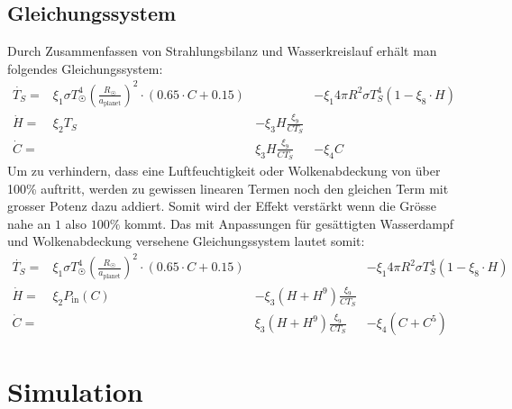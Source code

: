 \begin{refsection}
\subsection{Gleichungssystem}

Durch Zusammenfassen von Strahlungsbilanz und Wasserkreislauf erhält man folgendes Gleichungssystem:
\begin{equation}
\begin{matrix}
\dot{T_S} = & \xi_1 \sigma T_{\astrosun}^4 \left( \frac{R_{\astrosun}}{a_{\text{planet}}} \right) ^2 \cdot (0.65 \cdot C + 0.15) && - \xi_1 4 \pi R^2 \sigma T_{S}^4  (1 - \xi_8 \cdot H)\\
\dot{H}   = & \xi_2 T_S              & - \xi_3 H \frac{\xi_9}{C T_S}          & \\
\dot{C}   = &                        &   \xi_3 H \frac{\xi_9}{C T_S}          & - \xi_4 C
\end{matrix}
\end{equation}
Um zu verhindern, dass eine Luftfeuchtigkeit oder Wolkenabdeckung von über 100\% auftritt, werden zu gewissen linearen Termen noch den gleichen Term mit grosser Potenz dazu addiert. Somit wird der Effekt verstärkt wenn die Grösse nahe an $1$ also $100\%$ kommt. Das mit Anpassungen für gesättigten Wasserdampf und Wolkenabdeckung versehene Gleichungssystem lautet somit:
\begin{equation}
\begin{matrix}
\dot{T_S} = & \xi_1 \sigma T_{\astrosun}^4 \left( \frac{R_{\astrosun}}{a_{\text{planet}}} \right) ^2 \cdot (0.65 \cdot C + 0.15) && - \xi_1 4 \pi R^2 \sigma T_{S}^4  (1 - \xi_8 \cdot H)\\
\dot{H}   = & \xi_2 P_{\text{in}}(C) & - \xi_3 (H + H^9) \frac{\xi_9}{C T_S}   &                   \\
\dot{C}   = &                        &   \xi_3 (H + H^9) \frac{\xi_9}{C T_S}   & - \xi_4 (C + C^5)
\end{matrix}
\end{equation}

\section{Simulation}


\end{refsection}
